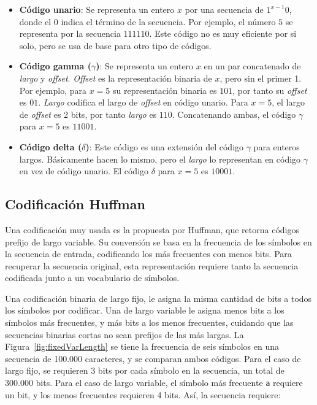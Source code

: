 \begin{itemize}
	\item \textbf{Código unario}: Se representa un entero $x$ por una secuencia de $1^{x-1}0$, donde el $0$ indica el término de la secuencia. Por ejemplo, el número $5$ se representa por la secuencia $111110$. Este código no es muy eficiente por si solo, pero se usa de base para otro tipo de códigos.
	
	\item \textbf{Código gamma ($\gamma$)}: Se representa un entero $x$ en un par concatenado de \textit{largo} y \textit{offset}. \textit{Offset} es la representación binaria de $x$, pero sin el primer 1. Por ejemplo, para $x=5$ su representación binaria es $101$, por tanto su \textit{offset} es $01$. \textit{Largo} codifica el largo de \textit{offset} en código unario. Para $x=5$, el largo de \textit{offset} es 2 bits, por tanto \textit{largo} es $110$. Concatenando ambas, el código $\gamma$ para $x=5$ es $11001$.
	
	\item \textbf{Código delta ($\delta$)}: Este código es una extensión del código $\gamma$ para enteros largos. Básicamente hacen lo mismo, pero el \textit{largo} lo representan en código $\gamma$ en vez de código unario. El código $\delta$ para $x=5$ es $10001$.
\end{itemize}

\subsection{Codificación Huffman}\label{sec:huffman}
Una codificación muy usada es la propuesta por Huffman\cite{huffman1952method}, que retorna códigos prefijo de largo variable. Su conversión se basa en la frecuencia de los símbolos en la secuencia de entrada, codificando los más frecuentes con menos bits. Para recuperar la secuencia original, esta representación requiere tanto la secuencia codificada junto a un vocabulario de símbolos.

Una codificación binaria de largo fijo, le asigna la misma cantidad de bits a todos los símbolos por codificar. Una de largo variable le asigna menos bits a los símbolos más frecuentes, y más bits a los menos frecuentes, cuidando que las secuencias binarias cortas no sean prefijos de las más largas. La Figura~\ref{fig:fixedVarLength} se tiene la frecuencia de seis símbolos en una secuencia de 100.000 caracteres, y se comparan ambos códigos. Para el caso de largo fijo, se requieren 3 bits por cada símbolo en la secuencia, un total de 300.000 bits. Para el caso de largo variable, el símbolo más frecuente \texttt{a} requiere un bit, y los menos frecuentes requieren 4 bits. Así, la secuencia requiere:

